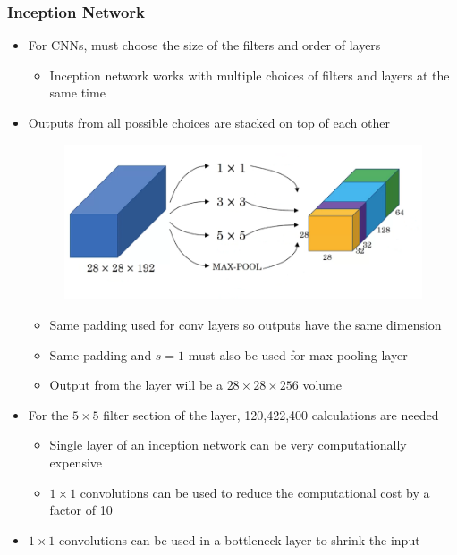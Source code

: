 \documentclass[12pt, letterpaper]{article}
\begin{document}
    \subsubsection{Inception Network}
    \begin{itemize}
        \item For CNNs, must choose the size of the filters and order of layers
        \begin{itemize}
            \item Inception network works with multiple choices of filters and layers at the same time
        \end{itemize}
        \item Outputs from all possible choices are stacked on top of each other
        \begin{figure}[ht]
            \centering
            \includegraphics[width=12cm]{27.png}
        \end{figure} 
        \begin{itemize}
            \item Same padding used for conv layers so outputs have the same dimension
            \item Same padding and $s=1$ must also be used for max pooling layer
            \item Output from the layer will be a $28\times 28\times 256$ volume
        \end{itemize}
        \item For the $5\times 5$ filter section of the layer, 120,422,400 calculations are needed
        \begin{itemize}
            \item Single layer of an inception network can be very computationally expensive
            \item $1\times 1$ convolutions can be used to reduce the computational cost by a factor of 10
        \end{itemize}
        \item $1\times 1$ convolutions can be used in a bottleneck layer to shrink the input

\end{itemize}
\end{document}
